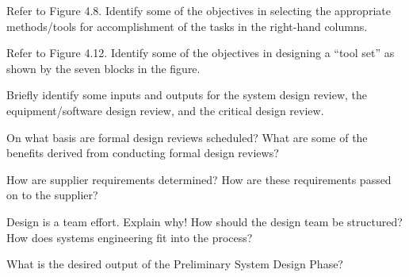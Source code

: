\begin{exercises}
    \begin{exercise}
    \label{sea-04-20}
        Refer to Figure 4.8. Identify some of the objectives in selecting the appropriate methods/tools for accomplishment of the tasks in the right-hand columns.
    \end{exercise}
    \begin{solution}
    \end{solution}
    
    \begin{exercise}
    \label{sea-04-21}
        Refer to Figure 4.12. Identify some of the objectives in designing a “tool set” as shown by the seven blocks in the figure.
    \end{exercise}
    \begin{solution}
    \end{solution}
    
    \begin{exercise}
    \label{sea-04-22}
        Briefly identify some inputs and outputs for the system design review, the equipment/software design review, and the critical design review.
    \end{exercise}
    \begin{solution}
    \end{solution}
    
    \begin{exercise}
    \label{sea-04-23}
        On what basis are formal design reviews scheduled? What are some of the benefits derived from conducting formal design reviews?
    \end{exercise}
    \begin{solution}
    \end{solution}
    
    \begin{exercise}
    \label{sea-04-24}
        How are supplier requirements determined? How are these requirements passed on to the supplier?
    \end{exercise}
    \begin{solution}
    \end{solution}
    
    \begin{exercise}
    \label{sea-04-25}
        Design is a team effort. Explain why! How should the design team be structured? How does systems engineering fit into the process?
    \end{exercise}
    \begin{solution}
    \end{solution}
    
    \begin{exercise}
    \label{sea-04-26}
        What is the desired output of the Preliminary System Design Phase?
    \end{exercise}
    \begin{solution}
    \end{solution}
\end{exercises}
